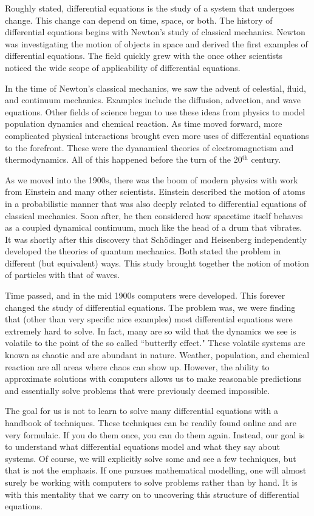         Roughly stated, differential equations is the study of a system that undergoes change.  This change can depend on time, space, or both.  The history of differential equations begins with Newton's study of classical mechanics.  Newton was investigating the motion of objects in space and derived the first examples of differential equations.  The field quickly grew with the once other scientists noticed the wide scope of applicability of differential equations.

        In the time of Newton's classical mechanics, we saw the advent of celestial, fluid, and continuum mechanics. Examples include the diffusion, advection, and wave equations.  Other fields of science began to use these ideas from physics to model population dynamics and chemical reaction.  As time moved forward, more complicated physical interactions brought even more uses of differential equations to the forefront.  These were the dyanamical theories of electromagnetism and thermodynamics.  All of this happened before the turn of the 20$^\textrm{th}$ century.

        As we moved into the 1900s, there was the boom of modern physics with work from Einstein and many other scientists.  Einstein described the motion of atoms in a probabilistic manner that was also deeply related to differential equations of classical mechanics.  Soon after, he then  considered how spacetime itself behaves as a coupled dynamical continuum, much like the head of a drum that vibrates.  It was shortly after this discovery that Sch\"odinger and Heisenberg independently developed the theories of quantum mechanics.  Both stated the problem in different (but equivalent) ways.  This study brought together the notion of motion of particles with that of waves.

        Time passed, and in the mid 1900s computers were developed.  This forever changed the study of differential equations.  The problem was, we were finding that (other than very specific nice examples) most differential equations were extremely hard to solve.  In fact, many are so wild that the dynamics we see is volatile to the point of the so called ``butterfly effect."  These volatile systems are known as chaotic and are abundant in nature.  Weather, population, and chemical reaction are all areas where chaos can show up.  However, the ability to approximate solutions with computers allows us to make reasonable predictions and essentially solve problems that were previously deemed impossible.

        The goal for us is not to learn to solve many differential equations with a handbook of techniques.  These techniques can be readily found online and are very formulaic.  If you do them once, you can do them again.  Instead, our goal is to understand what differential equations model and what they say about systems.  Of course, we will explicitly solve some and see a few techniques, but that is not the emphasis.  If one pursues mathematical modelling, one will almost surely be working with computers to solve problems rather than by hand. It is with this mentality that we carry on to uncovering this structure of differential equations.

